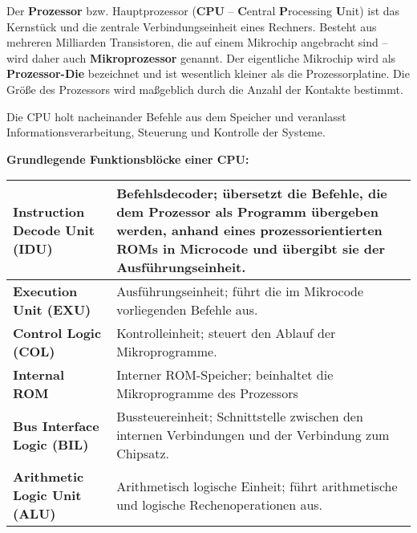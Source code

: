 \documentclass[asp1.tex]{subfiles}
\begin{document}
Der \textbf{Prozessor} bzw. Hauptprozessor (\textbf{CPU} – \textbf{C}entral \textbf{P}rocessing \textbf{U}nit) ist das Kernstück und die zentrale Verbindungseinheit eines Rechners.
Besteht aus mehreren Milliarden Transistoren, die auf einem Mikrochip angebracht sind – wird daher auch \textbf{Mikroprozessor} genannt.
Der eigentliche Mikrochip wird als \textbf{Prozessor-Die} bezeichnet und ist wesentlich kleiner als die Prozessorplatine. Die Größe des Prozessors wird maßgeblich durch die Anzahl der Kontakte bestimmt.

Die CPU holt nacheinander Befehle aus dem Speicher und veranlasst Informationsverarbeitung, Steuerung und Kontrolle der Systeme.

\textbf{Grundlegende Funktionsblöcke einer CPU:}

\begin{table}[H]
    \centering
    \begin{tabular}{|p{}|p{}|}
        \hline

        \textbf{Instruction Decode Unit (IDU)} & Befehlsdecoder; übersetzt die Befehle, die dem Prozessor als Programm übergeben werden, anhand eines prozessorientierten ROMs in Microcode und übergibt sie der Ausführungseinheit.

        \\\hline

        \textbf{Execution Unit (EXU)}          & Ausführungseinheit; führt die im Mikrocode vorliegenden Befehle aus.

        \\\hline

        \textbf{Control Logic (COL)}           & Kontrolleinheit; steuert den Ablauf der Mikroprogramme.

        \\\hline

        \textbf{Internal ROM}                  & Interner ROM-Speicher; beinhaltet die Mikroprogramme des Prozessors

        \\\hline

        \textbf{Bus Interface Logic (BIL)}     & Bussteuereinheit; Schnittstelle zwischen den internen Verbindungen und der Verbindung zum Chipsatz.

        \\\hline

        \textbf{Arithmetic Logic Unit (ALU)}   & Arithmetisch logische Einheit; führt arithmetische und logische Rechenoperationen aus.


\end{tabular}
\end{table}
\end{document}
